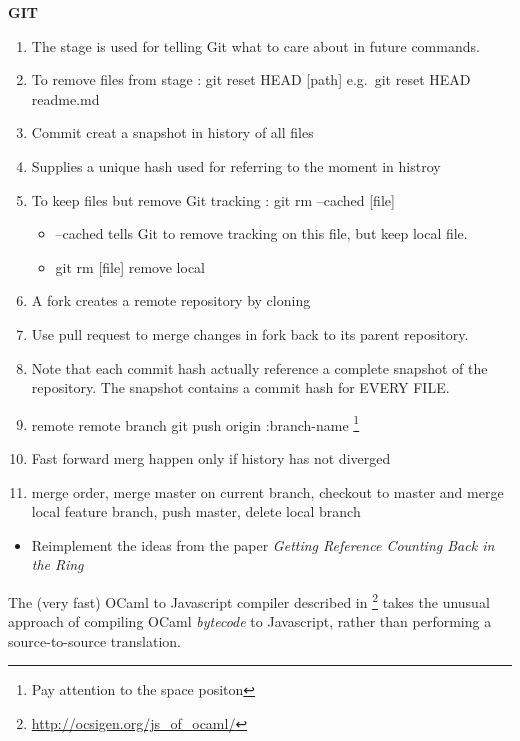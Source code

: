 \documentclass[a4paper]{tufte-handout}
\begin{document}
\textbf{GIT}
\begin{enumerate}
\item The stage is used for telling Git what to care about in future commands.
\item To remove files from stage : git reset  HEAD [path] e.g.\ git reset HEAD readme.md
\item Commit creat a snapshot in history of all files
\item Supplies a unique hash used for referring to the moment in histroy
\item To keep files but remove Git tracking : git rm --cached [file]
  \begin{itemize}
  \item --cached tells Git to remove tracking on this file, but keep local file.
  \item git rm [file] remove local
  \end{itemize}
\item A fork creates a remote repository by cloning
\item Use pull request to merge changes in fork back to its parent repository.
\item Note that each commit hash actually reference a complete snapshot of the repository. The snapshot contains a commit hash for EVERY FILE.
\item remote remote branch git push origin :{branch-name} \footnote {Pay attention to the space positon}
\item Fast forward merg happen only if history has not diverged
  \item merge order, merge master on current branch, checkout to master and merge local feature branch, push master, delete local branch
\end{enumerate}
\begin{maybe}
  \begin{itemize}
  \item Reimplement the ideas from the paper \textit{Getting Reference Counting Back in the Ring} \citep{Shahriyar+12}
  \end{itemize}
\end{maybe}



The (very fast) OCaml to Javascript compiler described in \citep{VouillonBalat13}\footnote{\url{http://ocsigen.org/js_of_ocaml/}} takes the unusual approach of compiling OCaml \textit{bytecode} to Javascript, rather than performing a source-to-source translation.
\end{document}

